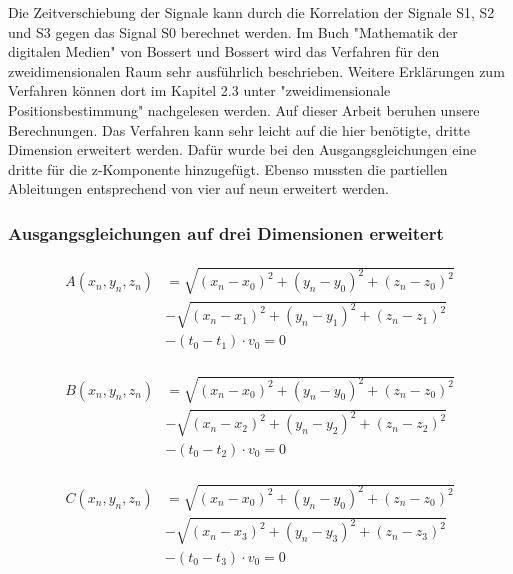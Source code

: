 Die Zeitverschiebung der Signale kann durch die Korrelation der Signale S1, S2 und S3 gegen das Signal S0 berechnet werden. Im Buch "Mathematik der digitalen Medien" von Bossert und Bossert wird das Verfahren für den zweidimensionalen Raum sehr ausführlich beschrieben. Weitere Erklärungen zum Verfahren können dort im Kapitel 2.3 unter "zweidimensionale Positionsbestimmung" nachgelesen werden. Auf dieser Arbeit beruhen unsere Berechnungen. Das Verfahren kann sehr leicht auf die hier benötigte, dritte Dimension erweitert werden. Dafür wurde bei den Ausgangsgleichungen eine dritte für die z-Komponente hinzugefügt. Ebenso mussten die partiellen Ableitungen entsprechend von vier auf neun erweitert werden. 
\subsubsection{Ausgangsgleichungen auf drei Dimensionen erweitert}

\begin{align}
\begin{split}
A(x_{n},y_{n},z_{n})  &=  \sqrt{(x_{n}- x_{0})^{2} + (y_{n} - y_{0})^{2} + (z_{n} - z_{0})^{2}} \\& - \sqrt{(x_{n}- x_{1})^{2} + (y_{n} - y_{1})^{2} + (z_{n} - z_{1})^{2}} \\ & - (t_{0} - t_{1}) \cdot v_{0} = 0\label{Gleichung1}
\end{split}
\end{align}

\begin{align}
\begin{split}
B(x_{n},y_{n},z_{n})  &=  \sqrt{(x_{n}- x_{0})^{2} + (y_{n} - y_{0})^{2} + (z_{n} - z_{0})^{2}} \\& - \sqrt{(x_{n}- x_{2})^{2} + (y_{n} - y_{2})^{2} + (z_{n} - z_{2})^{2}} \\ & - (t_{0} - t_{2}) \cdot v_{0} = 0
\end{split}
\end{align}

\begin{align}
\begin{split}
C(x_{n},y_{n},z_{n})  &=  \sqrt{(x_{n}- x_{0})^{2} + (y_{n} - y_{0})^{2} + (z_{n} - z_{0})^{2}} \\& - \sqrt{(x_{n}- x_{3})^{2} + (y_{n} - y_{3})^{2} + (z_{n} - z_{3})^{2}} \\ & - (t_{0} - t_{3}) \cdot v_{0} = 0\label{eq:Gleichung3}
\end{split}
\end{align}
